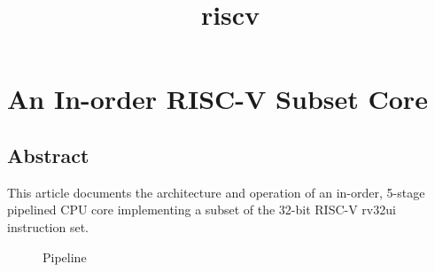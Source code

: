 \documentclass[a4paper,12pt]{refrep}
\title{riscv}
\begin{document}
\chapter{An In-order RISC-V Subset Core}


\section{Abstract}
This article documents the architecture and operation of an in-order,
5-stage pipelined CPU core implementing a subset of the 32-bit 
RISC-V rv32ui instruction set. 

\begin{figure}

    \caption{Pipeline}
\end{figure}
\end{document}
